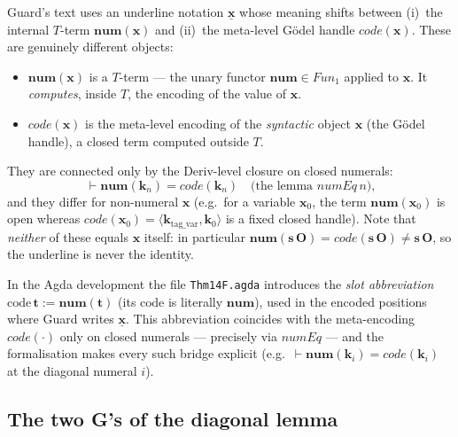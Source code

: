 \documentclass[11pt]{article}
\theoremstyle{plain}
\theoremstyle{definition}
\theoremstyle{remark}
\newcommand{\code}[1]{\mathit{code}(#1)}
\newcommand{\num}{\mathbf{num}}
\newcommand{\seq}[1]{\langle #1 \rangle}
\newcommand{\Fun}{\mathit{Fun}}
\begin{document}
Guard's text uses an underline notation $\underline{\mathbf{x}}$ whose
meaning shifts between (i)~the internal $T$-term $\num(\mathbf{x})$
and (ii)~the meta-level G\"odel handle $\code{\mathbf{x}}$.  These are
genuinely different objects:
\begin{itemize}
\item $\num(\mathbf{x})$ is a $T$-term --- the unary functor $\num \in
\Fun_1$ applied to $\mathbf{x}$.  It \emph{computes}, inside $T$, the
encoding of the value of $\mathbf{x}$.
\item $\code{\mathbf{x}}$ is the meta-level encoding of the
\emph{syntactic} object $\mathbf{x}$ (the G\"odel handle), a closed
term computed outside $T$.
\end{itemize}
They are connected only by the Deriv-level closure on closed numerals:
\[
\vdash \num(\mathbf{k}_n) = \code{\mathbf{k}_n}
\quad\text{(the lemma $\mathit{numEq}\,n$),}
\]
and they differ for non-numeral $\mathbf{x}$ (e.g.\ for a variable
$\mathbf{x}_0$, the term $\num(\mathbf{x}_0)$ is open whereas
$\code{\mathbf{x}_0} = \seq{\mathbf{k}_{\mathrm{tag\_var}}, \mathbf{k}_0}$
is a fixed closed handle).  Note that \emph{neither} of these equals
$\mathbf{x}$ itself: in particular $\num(\mathbf{s}\,\mathbf{O}) =
\code{\mathbf{s}\,\mathbf{O}} \neq \mathbf{s}\,\mathbf{O}$, so the
underline is never the identity.

In the Agda development the file \verb|Thm14F.agda| introduces the
\emph{slot abbreviation} $\mathrm{code}\,\mathbf{t} := \num(\mathbf{t})$
(its $\mathrm{code}$ is literally $\num$), used in the encoded
positions where Guard writes $\underline{\mathbf{x}}$.  This
abbreviation coincides with the meta-encoding $\code{\cdot}$ only on
closed numerals --- precisely via $\mathit{numEq}$ --- and the
formalisation makes every such bridge explicit
(e.g.\ $\vdash \num(\mathbf{k}_i) = \code{\mathbf{k}_i}$ at the
diagonal numeral $i$).

\subsection{The two G's of the diagonal lemma}
\end{document}
